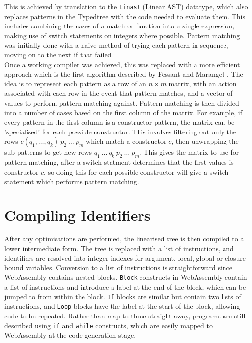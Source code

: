 This is achieved by translation to the \verb|Linast| (Linear AST) datatype, which also replaces patterns in the Typedtree with the code needed to evaluate them. This includes combining the cases of a match or function into a single expression, making use of switch statements on integers where possible. Pattern matching was initially done with a naive method of trying each pattern in sequence, moving on to the next if that failed. \\
Once a working compiler was achieved, this was replaced with a more efficient approach which is the first algorithm described by Fessant and Maranget \cite{ocamlpatternmatch}.  The idea is to represent each pattern as a row of an $n \times m$ matrix, with an action associated with each row in the event that pattern matches, and a vector of values to perform pattern matching against. Pattern matching is then divided into a number of cases based on the first column of the matrix. For example, if every pattern in the first column is a constructor pattern, the matrix can be 'specialised' for each possible constructor. This involves filtering out only the rows $c(q_1, \dots, q_k) \ p_2 \ \dots\ p_m$ which match a constructor $c$, then unwrapping the sub-patterns to get new rows $q_1 \ \dots\ q_k \ p_2 \ \dots\ p_m$. This gives the matrix to use for pattern matching, after a switch statment determines that the first values is constructor $c$, so doing this for each possible constructor will give a switch statement which performs pattern matching. 


\section{Compiling Identifiers}
After any optimisations are performed, the linearised tree is then compiled to a lower intermediate form. The tree is replaced with a list of instructions, and identifiers are resolved into integer indexes for argument, local, global or closure bound variables. 
Conversion to a list of instructions is straightforward since WebAssembly contains nested blocks. \verb|Block| constructs in WebAssembly contain a list of instructions and introduce a label at the end of the block, which can be jumped to from within the block. \verb|If| blocks are similar but contain two lists of instructions, and \verb|Loop| blocks have the label at the start of the block, allowing code to be repeated. 
Rather than map to these straight away, programs are still described using \verb|if| and \verb|while| constructs, which are easily mapped to WebAssembly at the code generation stage. %

